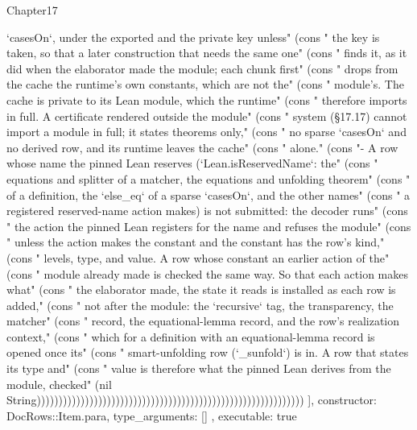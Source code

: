 \begin{lexlean}{Chapter17}
\begin{semanticmodule}
{{`casesOn`, under the exported and the private key unless" (cons "  the key is taken, so that a later construction that needs the same one" (cons "  finds it, as it did when the elaborator made the module; each chunk first" (cons "  drops from the cache the runtime's own constants, which are not the" (cons "  module's. The cache is private to its Lean module, which the runtime" (cons "  therefore imports in full. A certificate rendered outside the module" (cons "  system (§17.17) cannot import a module in full; it states theorems only," (cons "  no sparse `casesOn` and no derived row, and its runtime leaves the cache" (cons "  alone." (cons "- A row whose name the pinned Lean reserves (`Lean.isReservedName`: the" (cons "  equations and splitter of a matcher, the equations and unfolding theorem" (cons "  of a definition, the `else_eq` of a sparse `casesOn`, and the other names" (cons "  a registered reserved-name action makes) is not submitted: the decoder runs" (cons "  the action the pinned Lean registers for the name and refuses the module" (cons "  unless the action makes the constant and the constant has the row's kind," (cons "  levels, type, and value. A row whose constant an earlier action of the" (cons "  module already made is checked the same way. So that each action makes what" (cons "  the elaborator made, the state it reads is installed as each row is added," (cons "  not after the module: the `recursive` tag, the transparency, the matcher" (cons "  record, the equational-lemma record, and the row's realization context," (cons "  which for a definition with an equational-lemma record is opened once its" (cons "  smart-unfolding row (`_sunfold`) is in. A row that states its type and" (cons "  value is therefore what the pinned Lean derives from the module, checked" (nil String)))))))))))))))))))))))))))))))))))))))))))))))))))))))))))))
    ],
    constructor: DocRows::Item.para,
    type_arguments: []
  },
  executable: true
}


\end{semanticmodule}
\end{lexlean}
